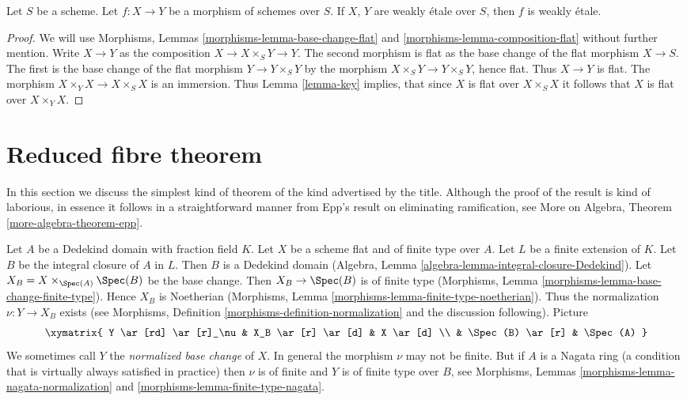 \begin{lemma}
\label{lemma-weakly-etale-permanence}
Let $S$ be a scheme. Let $f : X \to Y$ be a morphism of schemes over $S$.
If $X$, $Y$ are weakly \'etale over $S$, then $f$ is weakly \'etale.
\end{lemma}

\begin{proof}
We will use Morphisms, Lemmas \ref{morphisms-lemma-base-change-flat} and
\ref{morphisms-lemma-composition-flat} without further mention.
Write $X \to Y$ as the composition $X \to X \times_S Y \to Y$.
The second morphism is flat as the base change of the flat morphism
$X \to S$. The first is the base change of the flat morphism
$Y \to Y \times_S Y$ by the morphism $X \times_S Y \to Y \times_S Y$,
hence flat. Thus $X \to Y$ is flat. The morphism
$X \times_Y X \to X \times_S X$ is an immersion.
Thus Lemma \ref{lemma-key} implies, that since
$X$ is flat over $X \times_S X$ it follows that $X$ is
flat over $X \times_Y X$.
\end{proof}





\section{Reduced fibre theorem}
\label{section-reduced-fibre-theorem}

\noindent
In this section we discuss the simplest kind of theorem of the kind
advertised by the title. Although the proof of the result is kind of
laborious, in essence it follows in a straightforward manner from
Epp's result on eliminating ramification, see
More on Algebra, Theorem \ref{more-algebra-theorem-epp}.

\medskip\noindent
Let $A$ be a Dedekind domain with fraction field $K$.
Let $X$ be a scheme flat and of finite type over $A$.
Let $L$ be a finite extension of $K$. Let $B$ be the integral
closure of $A$ in $L$. Then $B$ is a Dedekind domain
(Algebra, Lemma \ref{algebra-lemma-integral-closure-Dedekind}).
Let $X_B = X \times_{\Spec(A)} \Spec(B)$ be the base change.
Then $X_B \to \Spec(B)$ is of finite type
(Morphisms, Lemma \ref{morphisms-lemma-base-change-finite-type}).
Hence $X_B$ is Noetherian
(Morphisms, Lemma \ref{morphisms-lemma-finite-type-noetherian}).
Thus the normalization $\nu : Y \to X_B$ exists (see
Morphisms, Definition \ref{morphisms-definition-normalization}
and the discussion following). Picture
\begin{equation}
\label{equation-normalized-base-change}
\xymatrix{
Y \ar[rd] \ar[r]_\nu & X_B \ar[r] \ar[d] & X \ar[d] \\
 & \Spec(B) \ar[r] & \Spec(A)
}
\end{equation}
We sometimes call $Y$ the {\it normalized base change} of $X$.
In general the morphism $\nu$ may not be finite. But if $A$ is
a Nagata ring (a condition that is virtually always satisfied in
practice) then $\nu$ is of finite and $Y$ is of finite type over $B$, see
Morphisms, Lemmas \ref{morphisms-lemma-nagata-normalization} and
\ref{morphisms-lemma-finite-type-nagata}.

